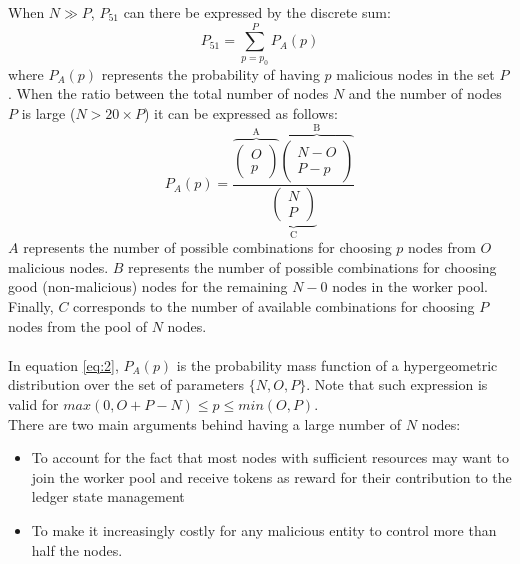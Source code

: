 When $N \gg P$, $P_{51}$ can there be expressed by the discrete sum:
\begin{equation}
\label{eq:1}
P_{51} = \sum_{p=p_0}^{P} P_{A}(p)
\end{equation}
where $P_{A}(p)$ represents the probability of having $p$ malicious nodes in the set $P$. When the ratio between the total number of nodes $N$ and the number of nodes $P$ is large ($N > 20\times P$) it can be expressed as follows: 
\begin{equation}
\label{eq:2}
P_{A}(p) = \frac{\overbrace{\left( \begin{array}{c} O \\
p \end{array} \right)}^\text{A} 
\overbrace{\left( \begin{array}{c} N - O \\ P - p \end{array} \right)}^\text{B}}{\underbrace{\left( \begin{array}{c} N \\
P \end{array} \right)}_\text{C}}
\end{equation}
$A$ represents the number of possible combinations for choosing $p$ nodes from $O$ malicious nodes. $B$ represents the number of possible combinations for choosing good (non-malicious) nodes for the remaining $N-0$ nodes in the worker pool. Finally, $C$ corresponds to the number of available combinations for choosing $P$ nodes from the pool of $N$ nodes.\\
\\
In equation \ref{eq:2}, $P_A(p)$ is the probability mass function of a hypergeometric distribution over the set of parameters $\{N,O,P\}$. Note that such expression is valid for $max(0,O+P-N) \leq p \leq min(O,P)$. \\

There are two main arguments behind having a large number of $N$ nodes:

\begin{itemize}
 \item To account for the fact that most nodes with sufficient resources may want to join the worker pool and receive tokens as reward for their contribution to the ledger state management
\item To make it increasingly costly for any malicious entity to control more than half the nodes.
\end{itemize}

